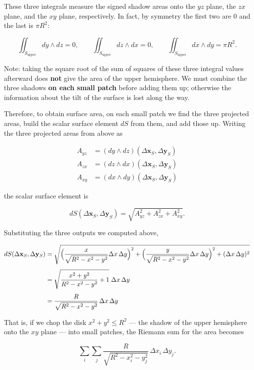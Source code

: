 \documentclass[a4paper,12pt,openany]{book}
\begin{document}
These three integrals measure the signed shadow areas onto the \(yz\)
plane, the \(zx\) plane, and the \(xy\) plane, respectively. In fact, by
symmetry the first two are \(0\) and the last is \(\pi R^2\):

\[
\iint_{S_{\text{upper}}} dy\wedge dz=0,\qquad
\iint_{S_{\text{upper}}} dz\wedge dx=0,\qquad
\iint_{S_{\text{upper}}} dx\wedge dy=\pi R^2.
\]

Note: taking the square root of the sum of squares of these three
integral values afterward does \textbf{not} give the area of the upper
hemisphere. We must combine the three shadows
\textbf{on each small patch} before adding them up; otherwise the
information about the tilt of the surface is lost along the way.

Therefore, to obtain surface area, on each small patch we find the three
projected areas, build the scalar surface element \(dS\) from them, and
add those up. Writing the three projected areas from above as

\[\begin{aligned}
A_{yz} &= (dy \wedge dz)(\Delta\mathbf{x}_S,\Delta\mathbf{y}_S) \\
A_{zx} &= (dz \wedge dx)(\Delta\mathbf{x}_S,\Delta\mathbf{y}_S) \\
A_{xy} &= (dx \wedge dy)(\Delta\mathbf{x}_S,\Delta\mathbf{y}_S)
\end{aligned}\]

the scalar surface element is

\[
dS(\Delta\mathbf{x}_S,\Delta\mathbf{y}_S)
= \sqrt{A_{yz}^2+A_{zx}^2+A_{xy}^2}.
\]

Substituting the three outputs we computed above,

\[\begin{aligned}
dS(\Delta\mathbf{x}_S,\Delta\mathbf{y}_S)
&= \sqrt{
\Bigl(\frac{x}{\sqrt{R^2-x^2-y^2}}\Delta x\,\Delta y\Bigr)^2
{}+ \Bigl(\frac{y}{\sqrt{R^2-x^2-y^2}}\Delta x\,\Delta y\Bigr)^2
{}+ (\Delta x\,\Delta y)^2} \\[4pt]
&= \sqrt{\frac{x^2+y^2}{R^2-x^2-y^2}+1}\;\Delta x\,\Delta y \\[4pt]
&= \frac{R}{\sqrt{R^2-x^2-y^2}}\,\Delta x\,\Delta y
\end{aligned}\]

That is, if we chop the disk \(x^2+y^2 \le R^2\) — the shadow of the
upper hemisphere onto the \(xy\) plane — into small patches, the
Riemann sum for the area becomes

\[\sum_i\sum_j
\frac{R}{\sqrt{R^2-x_i^2-y_j^2}}\,
\Delta x_i\,\Delta y_j.\]
\end{document}
